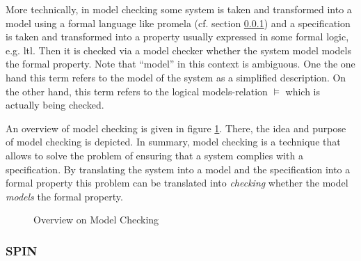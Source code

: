 More technically, in model checking some system is taken and transformed into a model using a formal language like \gls{promela} (cf. section \ref{sec:spin}) and a specification is taken and transformed into a property usually expressed in some formal logic, e.g. \gls{ltl}.
Then it is checked via a model checker whether the system model models the formal property.
Note that \enquote{model} in this context is ambiguous.
One the one hand this term refers to the model of the system as a simplified description.
On the other hand, this term refers to the logical models-relation $ \models $ which is actually being checked.

An overview of model checking is given in figure \ref{fig:model-checking}.
There, the idea and purpose of model checking is depicted.
In summary, model checking is a technique that allows to solve the problem of ensuring that a system complies with a specification.
By translating the system into a model and the specification into a formal property this problem can be translated into \textit{checking} whether the model \textit{models} the formal property.

\begin{figure}
    \centering
    \caption{Overview on Model Checking}
    \label{fig:model-checking}
\end{figure}

\subsubsection{SPIN}
\label{sec:spin}


